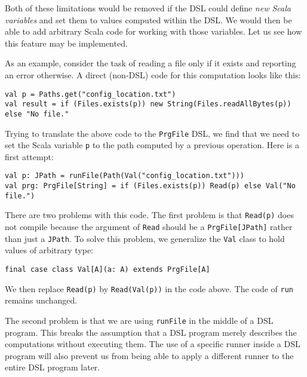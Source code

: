 Both of these limitations would be removed if the DSL could define
\emph{new Scala variables} and set them to values computed within
the DSL. We would then be able to add arbitrary Scala code for working
with those variables. Let us see how this feature may be implemented.

As an example, consider the task of reading a file only if it exists
and reporting an error otherwise. A direct (non-DSL) code for this
computation looks like this:
\begin{lstlisting}
val p = Paths.get("config_location.txt")
val result = if (Files.exists(p)) new String(Files.readAllBytes(p)) else "No file."
\end{lstlisting}
Trying to translate the above code to the \lstinline!PrgFile!
DSL, we find that we need to set the Scala variable \lstinline!p!
to the path computed by a previous operation. Here is a first attempt:
\begin{lstlisting}
val p: JPath = runFile(Path(Val("config_location.txt")))
val prg: PrgFile[String] = if (Files.exists(p)) Read(p) else Val("No file.")
\end{lstlisting}
There are two problems with this code. The first problem is that \lstinline!Read(p)!
does not compile because the argument of \lstinline!Read!
should be a \lstinline!PrgFile[JPath]!
rather than just a \lstinline!JPath!.
To solve this problem, we generalize the \lstinline!Val!
class to hold values of arbitrary type:
\begin{lstlisting}
final case class Val[A](a: A) extends PrgFile[A]
\end{lstlisting}
We then replace \lstinline!Read(p)!
by \lstinline!Read(Val(p))!
in the code above. The code of \lstinline!run!
remains unchanged.

The second problem is that we are using \lstinline!runFile!
in the middle of a DSL program. This breaks the assumption that a
DSL program merely describes the computations without executing them.
The use of a specific runner inside a DSL program will also prevent
us from being able to apply a different runner to the entire DSL program
later.

